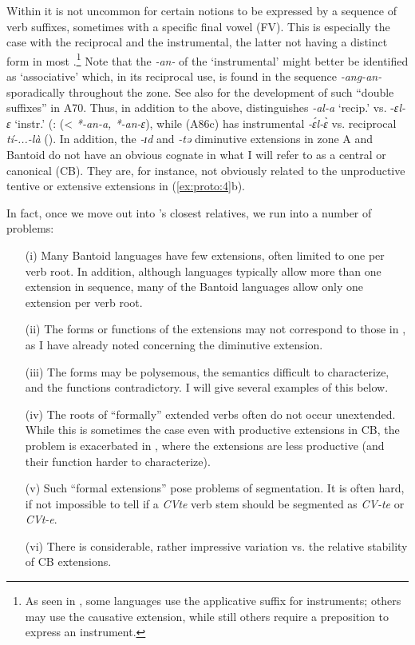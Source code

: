 \documentclass[output=paper]{langsci/langscibook}
\begin{document}
Within  it is not uncommon for certain notions to be expressed by a sequence of verb suffixes, sometimes with a specific final vowel (FV). This is especially the case with the reciprocal and the instrumental, the latter not having a distinct form in most .\footnote{As 
 seen in , some  languages use the applicative suffix for instruments; others may use the causative extension, while still others require a preposition to express an instrument.}  
Note that the \textit{-an-} of the ‘instrumental’ might better be identified as ‘associative’ which, in its reciprocal use, is found in the sequence \textit{-ang-an-} sporadically throughout the  zone. See also \citet{BostoenNzangBie2010} for the development of such “double suffixes” in {A70}. Thus, in addition to the above,  distinguishes \textit{-al-a} ‘recip.’ vs. -\textit{ɛl-ɛ} ‘instr.’ (\citealt{NgueUm2002}:  (< \textit{*-an-a, *-an-ɛ}), while  (A86c) has instrumental \textit{-ɛ́l-ɛ̀} vs. reciprocal \textit{tí-...-là} (\citealt[38]{NgantchoLebika2003}). In addition, the \textit{-ɪd} and \textit{-tə} diminutive extensions in zone A and Bantoid do not have an obvious cognate in what I will refer to as a central or canonical  (CB). They are, for instance, not obviously related to the unproductive tentive or extensive extensions in (\ref{ex:proto:4}b).

\newpage 
In fact, once we move out into ’s closest relatives, we run into a number of problems:

\begin{itemize}
\item[(i)]  Many Bantoid languages have few extensions, often limited to one per verb root. In addition, although  languages typically allow more than one extension in sequence, many of the Bantoid languages allow only one extension per verb root.

\item[(ii)] The forms or functions of the extensions may not correspond to those in , as I have already noted concerning the diminutive extension.

\item[(iii)] The forms may be polysemous, the semantics difficult to characterize, and the functions contradictory. I will give several examples of this below.

\item[(iv)] The roots of “formally” extended verbs often do not occur unextended. While this is sometimes the case even with productive extensions in CB, the problem is exacerbated in , where the extensions are less productive (and their function harder to characterize).

\item[(v)] Such “formal extensions” pose problems of segmentation. It is often hard, if not impossible to tell if a \textit{CVte} verb stem should be segmented as \textit{CV-te} or \textit{CVt-e}.

\item[(vi)] There is considerable, rather impressive variation vs. the relative stability of CB extensions.
\end{itemize}
\end{document}
